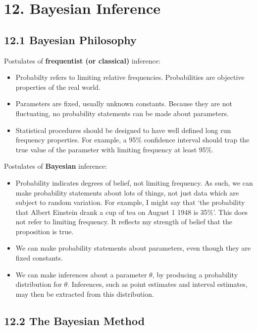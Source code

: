 \section{12. Bayesian Inference}\label{bayesian-inference}

\subsection{12.1 Bayesian Philosophy}\label{bayesian-philosophy}

Postulates of \textbf{frequentist (or classical)} inference:

\begin{itemize}[tightlist]
\item
  Probabilty refers to limiting relative frequencies. Probabilities are
  objective properties of the real world.
\item
  Parameters are fixed, usually unknown constants. Because they are not
  fluctuating, no probability statements can be made about parameters.
\item
  Statistical procedures should be designed to have well defined long
  run frequency properties. For example, a 95\% confidence interval
  should trap the true value of the parameter with limiting frequency at
  least 95\%.
\end{itemize}

Postulates of \textbf{Bayesian} inference:

\begin{itemize}[tightlist]
\item
  Probability indicates degrees of belief, not limiting frequency. As
  such, we can make probability statements about lots of things, not
  just data which are subject to random variation. For example, I might
  say that `the probability that Albert Einstein drank a cup of tea on
  August 1 1948 is 35\%'. This does not refer to limiting frequency. It
  reflects my strength of belief that the proposition is true.
\item
  We can make probability statements about parameters, even though they
  are fixed constants.
\item
  We can make inferences about a parameter \(\theta\), by producing a
  probability distribution for \(\theta\). Inferences, such as point
  estimates and interval estimates, may then be extracted from this
  distribution.
\end{itemize}

\subsection{12.2 The Bayesian Method}\label{the-bayesian-method}

